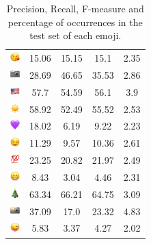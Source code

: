 \documentclass{article}
\begin{document}
\begin{table}
\begin{tabular}{|c|ccc|c|}
\includegraphics[height=0.37cm,width=0.37cm]{img/face_blowing_a_kiss.png} & 15.06 & 15.15 & 15.1 & 2.35\\ 
\includegraphics[height=0.37cm,width=0.37cm]{img/camera.png} & 28.69 & 46.65 & 35.53 & 2.86\\ 
\includegraphics[height=0.37cm,width=0.37cm]{img/United_States.png} & 57.7 & 54.59 & 56.1 & 3.9\\ 
\includegraphics[height=0.37cm,width=0.37cm]{img/sun.png} & 58.92 & 52.49 & 55.52 & 2.53\\ 
\includegraphics[height=0.37cm,width=0.37cm]{img/purple_heart.png} & 18.02 & 6.19 & 9.22 & 2.23\\ 
\includegraphics[height=0.37cm,width=0.37cm]{img/winking_face.png} & 11.29 & 9.57 & 10.36 & 2.61\\ 
\includegraphics[height=0.37cm,width=0.37cm]{img/hundred_points.png} & 23.25 & 20.82 & 21.97 & 2.49\\ 
\includegraphics[height=0.37cm,width=0.37cm]{img/beaming_face_with_smiling_eyes.png} & 8.43 & 3.04 & 4.46 & 2.31\\ 
\includegraphics[height=0.37cm,width=0.37cm]{img/Christmas_tree.png} & 63.34 & 66.21 & 64.75 & 3.09\\ 
\includegraphics[height=0.37cm,width=0.37cm]{img/camera_with_flash.png} & 37.09 & 17.0 & 23.32 & 4.83\\ 
\includegraphics[height=0.37cm,width=0.37cm]{img/winking_face_with_tongue.png} & 5.83 & 3.37 & 4.27 & 2.02\\ 

\hline
\end{tabular}
\caption{\label{table:emoji_detailed} Precision, Recall, F-measure and percentage of occurrences in the test set of each emoji.}
\end{table}
\end{document}
